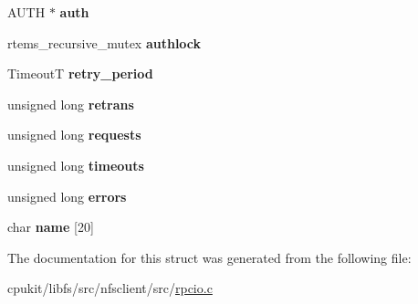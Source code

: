 \begin{DoxyCompactItemize}
\begin{tabbing}
\end{tabbing}\item 
\mbox{\label{structRpcUdpServerRec___a4696cdfcd95610d5a3305e3fc760d426}} 
A\+U\+TH $\ast$ {\bfseries auth}
\item 
\mbox{\label{structRpcUdpServerRec___a9729e20268937827d6bea240e31d6812}} 
rtems\+\_\+recursive\+\_\+mutex {\bfseries authlock}
\item 
\mbox{\label{structRpcUdpServerRec___a40988f03cfe7a038cdcb4cab4c927908}} 
TimeoutT {\bfseries retry\+\_\+period}
\item 
\mbox{\label{structRpcUdpServerRec___a9fe521e0265a677da68d5195ed9a2024}} 
unsigned long {\bfseries retrans}
\item 
\mbox{\label{structRpcUdpServerRec___a6737d6eb5fefe64d8bca7492afb04926}} 
unsigned long {\bfseries requests}
\item 
\mbox{\label{structRpcUdpServerRec___abb10a069702b6ece011383267929c011}} 
unsigned long {\bfseries timeouts}
\item 
\mbox{\label{structRpcUdpServerRec___a8d036945f8ae6dbc02f7b7d31c7b231b}} 
unsigned long {\bfseries errors}
\item 
\mbox{\label{structRpcUdpServerRec___adda79b65d503cee3b106acf829ee95bd}} 
char {\bfseries name} \mbox{[}20\mbox{]}
\end{DoxyCompactItemize}


The documentation for this struct was generated from the following file\+:\begin{DoxyCompactItemize}
\item 
cpukit/libfs/src/nfsclient/src/\mbox{\hyperlink{rpcio_8c}{rpcio.\+c}}\end{DoxyCompactItemize}
